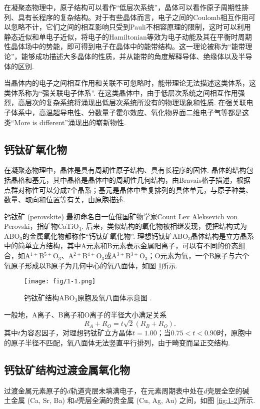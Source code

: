 \documentclass[12pt,a4paper,openany,twoside,UTF-8]{book}
\begin{document}
在凝聚态物理中，原子结构可以看作“低层次系统”，晶体可以看作原子周期性排列、具有长程序的复杂结构。对于有些晶体而言，电子之间的Coulomb相互作用可以忽略不计，它们之间的相互影响只受到Pauli不相容原理的限制，这时可以利用静态近似和单电子近似，将电子的Hamiltonian等效为电子动能及其在平衡时周期性晶体场中的势能，即可得到电子在晶体中的能带结构。这一理论被称为“能带理论”，能够成功描述大多晶体的性质，并从能带的角度解释导体、绝缘体以及半导体的区别.

当晶体内的电子之间相互作用和关联不可忽略时，能带理论无法描述这类体系，这类体系称为“强关联电子体系”. 在这类晶体中，由于低层次系统之间相互作用强烈，高层次的复杂系统将涌现出低层次系统所没有的物理现象和性质. 在强关联电子体系中，高温超导电性、分数量子霍尔效应、氧化物界面二维电子气等都是这类“More is different”涌现出的崭新物性.

\subsection{钙钛矿氧化物}

在凝聚态物理中，晶体是具有周期性原子结构、具有长程序的固体. 晶体的结构包括晶格和基元，其中晶格是晶体中的周期性几何结构，由Bravais格子描述，根据点群对称性可以分成7个晶系；基元是晶体中重复排列的具体单元，与原子种类、数量、取向和位置等有关，由原胞描述. 

钙钛矿 (perovskite) 最初命名自一位俄国矿物学家Count Lev Aleksevich von Perovski，指矿物CaTiO$_3$. 后来，类似结构的氧化物被相继发现，便把结构式为ABO$_3$的金属氧化物都称作“钙钛矿氧化物”. 理想钙钛矿ABO$_3$晶体结构是立方晶系中的简单立方结构，其中A元素和B元素表示金属阳离子，可以有不同的价态组合，如A$^{1+}$B$^{5+}$O$_3$、A$^{2+}$B$^{4+}$O$_3$或A$^{3+}$B$^{3+}$O$_3$；O元素为氧，一个B原子与六个氧原子形成以B原子为几何中心的氧八面体，如图 \ref{fig:1-1}所示.

\begin{figure}[htbp]
\centering
\texttt{[image: fig/1-1.png]}
\caption{钙钛矿结构ABO$_3$原胞及氧八面体示意图 \cite{ref2}.}
\label{fig:1-1} 
\end{figure}

一般地，A离子、B离子和O离子的半径大小满足关系
\begin{equation}
R_A+R_O=t\sqrt{2}(R_B+R_O).
\label{eq:1-1}
\end{equation}
其中$t$为容忍因子，对理想钙钛矿立方晶体$t = 1.00$；当$0.75 < t < 0.90$时，原胞中的原子半径不匹配，氧八面体无法竖直平行排列，由于畸变而呈正交结构.

\subsection{钙钛矿结构过渡金属氧化物}
过渡金属元素原子的$d$轨道壳层未填满电子，在元素周期表中处在$d$壳层全空的碱土金属 (Ca, Sr, Ba) 和$d$壳层全满的贵金属 (Cu, Ag, Au) 之间，如图 \ref{fig:1-2}所示.
\end{document}
